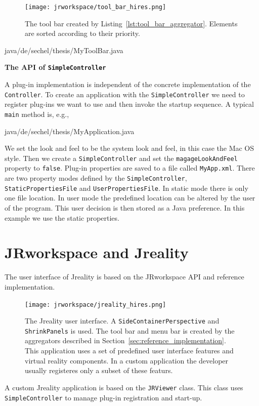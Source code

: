 \documentclass[Thesis.tex]{subfiles}
\begin{document}
\begin{figure}[H]
\centering
\texttt{[image: jrworkspace/tool\_bar\_hires.png]}
\caption{The tool bar created by Listing~\ref{lst:tool_bar_aggregator}. Elements are sorted according to their
priority.}
\label{fig:tool_bar_aggregator}
\end{figure}

 {java/de/sechel/thesis/MyToolBar.java}

{\bf The API of {\tt SimpleController}}

A plug-in implementation is independent of the concrete implementation of the {\tt Controller}. To create an
application with the {\tt SimpleController} we need to register plug-ins we want to use and then invoke the
startup sequence. A typical {\tt main} method is, e.g.,

 {java/de/sechel/thesis/MyApplication.java}

We set the look and feel to be the system look and feel, in this case the Mac OS style. Then we create a
{\tt SimpleController} and set the {\tt magageLookAndFeel} property to {\tt false}. Plug-in properties are saved
to a file called {\tt MyApp.xml}. There are two property modes defined by the {\tt SimpleController}, {\tt StaticPropertiesFile}
and {\tt UserPropertiesFile}. In static mode there is only one file location. In user mode the predefined location can
be altered by the user of the program. This user decision is then stored as a {\sc Java} preference. In this example 
we use the static properties.

\section{{\sc JRworkspace} and {\sc Jreality}}

The user interface of {\sc Jreality} \cite{JrealityWebsite} is based on the {\sc JRworkspace} API and reference
implementation.

\begin{figure}[H]
\centering
\texttt{[image: jrworkspace/jreality\_hires.png]}
\caption[The {\sc Jreality} user interface.]{The {\sc Jreality} user interface. A {\tt SideContainerPerspective} 
and {\tt ShrinkPanels} is used. The tool bar and 
menu bar is created by the aggregators described in Section~\ref{sec:reference_implementation}. This application
uses a set of predefined user interface features and virtual reality components. In a custom application the developer 
usually registeres only a subset of these featurs.}
\label{fig:jrworkspace_jreality}
\end{figure}

A custom {\sc Jreality} application is based on the {\tt JRViewer} class. This class uses {\tt SimpleController} to manage
plug-in registration and start-up. 

\subfilebibliography
\end{document}
